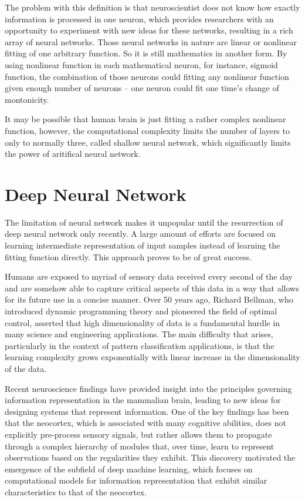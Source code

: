 \documentclass[a4paper]{book}
\begin{document}
  The problem with this definition is that neuroscientist does not know
  how exactly information is processed in one neuron, which provides
  researchers with an opportunity to experiment with new ideas for these
  networks, resulting in a rich array of neural networks. Those neural
  networks in nature are linear or nonlinear fitting of one arbitrary
  function. So it is still mathematics in another form.  By using
  nonlinear function in each mathematical neuron, for instance, sigmoid
  function, the combination of those neurons could fitting any nonlinear
  function given enough number of neurons -- one neuron could fit one
  time's change of montonicity.

  It may be possible that human brain is just fitting a rather complex
  nonlinear function, however, the computational complexity limits the
  number of layers to only to normally three, called shallow neural
  network, which significantly limits the power of aritifical neural
  network.

  \section{Deep Neural Network}

  The limitation of neural network makes it unpopular until the
  resurrection of deep neural network only recently. A large amount of
  efforts are focused on learning intermediate representation of input
  samples instead of learning the fitting function directly. This
  approach proves to be of great success.

  Humans are exposed to myriad of sensory data received every second
  of the day and are somehow able to capture critical aspects of this
  data in a way that allows for its future use in a concise manner.
  Over 50 years ago, Richard Bellman, who introduced dynamic
  programming theory and pioneered the field of optimal control,
  asserted that high dimensionality of data is a fundamental hurdle in
  many science and engineering applications. The main difficulty that
  arises, particularly in the context of pattern classification
  applications, is that the learning complexity grows exponentially
  with linear increase in the dimensionality of the
  data\cite{Arel:2010:RFD:1921914.1921920}.

  Recent neuroscience findings have provided insight into the
  principles governing information representation in the mammalian
  brain, leading to new ideas for designing systems that represent
  information.  One of the key findings has been that the neocortex,
  which is associated with many cognitive abilities, does not
  explicitly pre-process sensory signals, but rather allows them to
  propagate through a complex hierarchy of modules that, over
  time, learn to represent observations based on the regularities they
  exhibit. This discovery motivated the emergence of the subfield of
  deep machine learning, which focuses on computational models for
  information representation that exhibit similar characteristics to
  that of the neocortex\cite{Arel:2010:RFD:1921914.1921920}.
\end{document}
